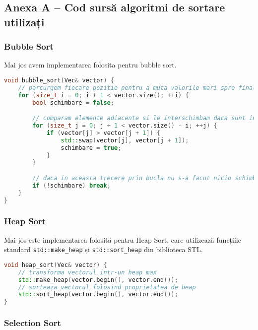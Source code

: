 \documentclass{article}
\begin{document}
\subsection*{Anexa A – Cod sursă algoritmi de sortare utilizați}

\subsubsection*{Bubble Sort}
Mai jos avem implementarea folosita pentru bubble sort.

\begin{lstlisting}[language=C++, caption={Bubble Sort}, label={lst:bubble}]
void bubble_sort(Vec& vector) {
    // parcurgem fiecare pozitie pentru a muta valorile mari spre final
    for (size_t i = 0; i + 1 < vector.size(); ++i) {
        bool schimbare = false;

        // comparam elemente adiacente si le interschimbam daca sunt in ordine gresita
        for (size_t j = 0; j + 1 < vector.size() - i; ++j) {
            if (vector[j] > vector[j + 1]) {
                std::swap(vector[j], vector[j + 1]);
                schimbare = true;
            }
        }

        // daca in aceasta trecere prin bucla nu s-a facut nicio schimbare, vectorul este sortat
        if (!schimbare) break;
    }
}
\end{lstlisting}

\subsubsection*{Heap Sort}

Mai jos este implementarea folosită pentru Heap Sort, care utilizează funcțiile standard \texttt{std::make\_heap} și \texttt{std::sort\_heap} din biblioteca STL.

\begin{lstlisting}[language=C++, caption={Heap Sort}, label={lst:heap}]
void heap_sort(Vec& vector) {
    // transforma vectorul intr-un heap max
    std::make_heap(vector.begin(), vector.end());
    // sorteaza vectorul folosind proprietatea de heap
    std::sort_heap(vector.begin(), vector.end());
}

\end{lstlisting}


\subsubsection*{Selection Sort}
\end{document}
